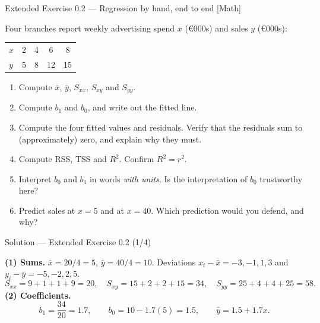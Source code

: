 \documentclass[aspectratio=169,11pt]{beamer}
\begin{document}
\begin{frame}{Extended Exercise 0.2 --- Regression by hand, end to end [Math]}
  \begin{longexercise}
    Four branches report weekly advertising spend $x$ (\euro 000s) and sales
    $y$ (\euro 000s):
    \begin{center}\footnotesize
    \begin{tabular}{@{}lcccc@{}}
      \toprule
      $x$ & 2 & 4 & 6 & 8 \\
      $y$ & 5 & 8 & 12 & 15 \\
      \bottomrule
    \end{tabular}
    \end{center}
    \begin{enumerate}
      \item Compute $\bar x$, $\bar y$, $S_{xx}$, $S_{xy}$ and $S_{yy}$.
      \item Compute $b_1$ and $b_0$, and write out the fitted line.
      \item Compute the four fitted values and residuals. Verify that the
            residuals sum to (approximately) zero, and explain why they must.
      \item Compute RSS, TSS and $R^2$. Confirm $R^2 = r^2$.
      \item Interpret $b_0$ and $b_1$ in words \emph{with units}. Is the
            interpretation of $b_0$ trustworthy here?
      \item Predict sales at $x = 5$ and at $x = 40$. Which prediction would
            you defend, and why?
    \end{enumerate}
  \end{longexercise}
\end{frame}

\begin{frame}{Solution --- Extended Exercise 0.2 (1/4)}
  \begin{solutionbox}
    \textbf{(1) Sums.} $\bar x = 20/4 = 5$, $\bar y = 40/4 = 10$.
    Deviations $x_i - \bar x = -3,-1,1,3$ and $y_i - \bar y = -5,-2,2,5$.
    \[
      S_{xx} = 9+1+1+9 = 20, \quad
      S_{xy} = 15+2+2+15 = 34, \quad
      S_{yy} = 25+4+4+25 = 58 .
    \]
    \textbf{(2) Coefficients.}
    \[
      b_1 = \frac{34}{20} = 1.7,
      \qquad
      b_0 = 10 - 1.7(5) = 1.5,
      \qquad
      \hat y = 1.5 + 1.7x .
    \]
  \end{solutionbox}
\end{frame}
\end{document}
